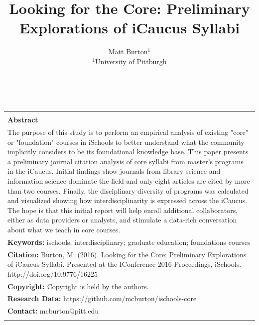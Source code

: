 \documentclass[10pt, letterpaper]{article}
\title{Looking for the Core: Preliminary Explorations of iCaucus Syllabi}
\date{} %
\author{%
{\large Matt Burton$^{1}$\\} %
$^{1}$University of Pittburgh\\ %
}
\makeatletter
\renewcommand{\maketitle}{\bgroup\setlength{\parindent}{0pt}
\begin{flushleft}
  {\sffamily \Large {\@title} }
  \vspace{12pt}\\
  \@author
\end{flushleft}\egroup
}
\makeatother
\begin{document}
\newenvironment{blockquote}{\list{}{\leftmargin=0.5in\rightmargin=0.0in}\item[]}{\endlist}
\renewcommand{\listfigurename}{Table of Figures} 
\renewcommand{\listtablename}{Table of Tables} 
\maketitle %
\thispagestyle{empty} %


\begin{center}
\begin{tabularx}{\textwidth}{|X|}
\hline
\vspace{2pt}\\
\textbf{Abstract}\\
The purpose of this study is to perform an empirical analysis of existing "core" or "foundation" courses in iSchools to better understand what the community implicitly considers to be its foundational knowledge base. This paper presents a preliminary journal citation analysis of core syllabi from master's programs in the iCaucus. Initial findings show journals from library science and information science dominate the field and only eight articles are cited by more than two courses. Finally, the disciplinary diversity of programs was calculated and visualized showing how interdisciplinarity is expressed across the iCaucus. The hope is that this initial report will help enroll additional collaborators, either as data providers or analysts, and stimulate a data-rich conversation about what we teach in core courses.\\
{\footnotesize \textbf{Keywords:} ischools; interdisciplinary; graduate education; foundations courses}\\
{\footnotesize \textbf{Citation:}  Burton, M. (2016). Looking for the Core: Preliminary Explorations of iCaucus Syllabi. Presented at the IConference 2016 Proceedings, iSchools. http://doi.org/10.9776/16225
}\\
{\footnotesize \textbf{Copyright:} Copyright is held by the authors.}\\
{\footnotesize \textbf{Research Data:}  https://github.com/mcburton/ischools-core} \\ %
{\footnotesize \textbf{Contact:} mcburton@pitt.edu}\\ %
\vspace{2pt}\\
\hline
\end{tabularx}
\end{center}
\end{document}
